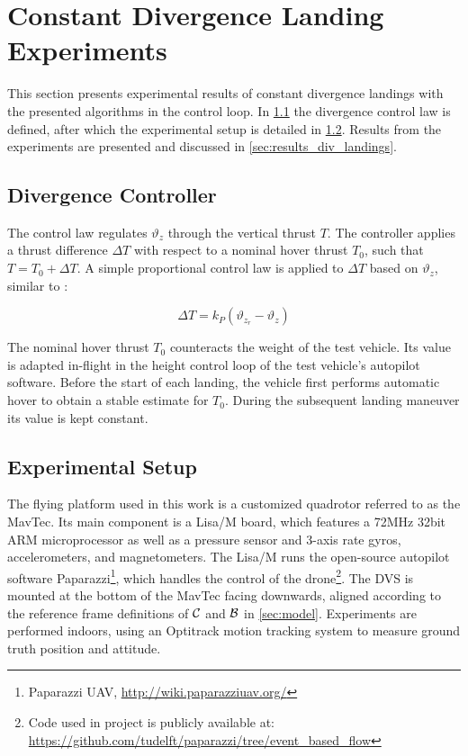 \section{Constant Divergence Landing Experiments}
\label{sec:results}
This section presents experimental results of constant divergence landings with the presented algorithms in the control loop. In \cref{sec:results_controller} the divergence control law is defined, after which the experimental setup is detailed in \cref{sec:experimental_setup}. Results from the experiments are presented and discussed in \cref{sec:results_div_landings}.

\subsection{Divergence Controller}
\label{sec:results_controller}
The control law regulates $\vartheta_z$ through the vertical thrust $T$. The controller applies a thrust difference $\Delta T$ with respect to a nominal hover thrust $T_0$, such that $T = T_0 + \Delta T$. A simple proportional control law is applied to $\Delta T$ based on $\vartheta_z$, similar to \citet{DeCroon2016}:

\begin{equation}
\Delta T = k_P \left(\vartheta_{z_{r}}-\vartheta_z\right)
\end{equation}

The nominal hover thrust $T_0$ counteracts the weight of the test vehicle. Its value is adapted in-flight in the height control loop of the test vehicle's autopilot software. Before the start of each landing, the vehicle first performs automatic hover to obtain a stable estimate for $T_0$. During the subsequent landing maneuver its value is kept constant.

\subsection{Experimental Setup}
\label{sec:experimental_setup}
The flying platform used in this work is a customized quadrotor referred to as the MavTec. Its main component is a Lisa/M board, which features a 72MHz 32bit ARM microprocessor as well as a pressure sensor and 3-axis rate gyros, accelerometers, and magnetometers. The Lisa/M runs the open-source autopilot software Paparazzi\footnote{Paparazzi UAV, \url{http://wiki.paparazziuav.org/}}, which handles the control of the drone\footnote{Code used in project is publicly available at: \url{https://github.com/tudelft/paparazzi/tree/event_based_flow}}. The DVS is mounted at the bottom of the MavTec facing downwards, aligned according to the reference frame definitions of $\cal C$ and $\cal B$ in \cref{sec:model}. Experiments are performed indoors, using an Optitrack motion tracking system to measure ground truth position and attitude.

